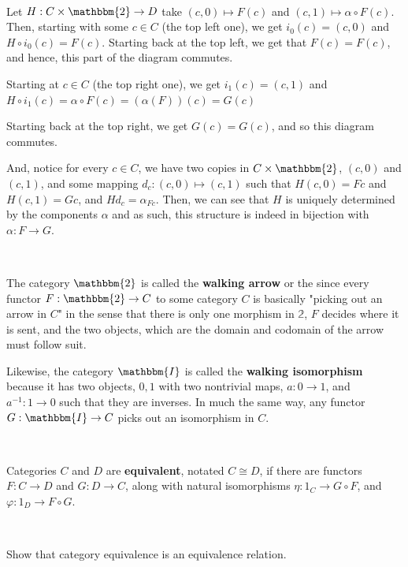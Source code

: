 \documentclass{article}
\begin{document}
\begin{customproof}
\

Let $H: C \times \mathbbm{2} \to D$ take $(c,0) \mapsto F(c)$ and $(c,1) \mapsto \alpha \circ F(c)$. Then, starting with some $c \in C$ (the top left one), we get $i_0(c) = (c,0)$ and $H \circ i_0(c) = F(c)$. Starting back at the top left, we get that $F(c) = F(c)$, and hence, this part of the diagram commutes. 

Starting at $c \in C$ (the top right one), we get $i_1(c) = (c,1)$ and $H \circ i_1(c) = \alpha \circ F(c) = (\alpha(F))(c) = G(c)$

Starting back at the top right, we get $G(c) = G(c)$, and so this diagram commutes. 

And, notice for every $c \in C$, we have two copies in $C \times \mathbbm{2}$, $(c,0)$ and $(c,1)$, and some mapping $d_c: (c,0) \mapsto (c, 1)$ such that $H(c,0) = Fc$ and $H(c,1) = Gc$, and $Hd_c = \alpha_{Fc}$. Then, we can see that $H$ is uniquely determined by the components $\alpha$ and as such, this structure is indeed in bijection with $\alpha: F \to G$.
\end{customproof}

\begin{definition}
\

The category $\mathbbm{2}$ is called the \textbf{walking arrow} or the since every functor $F: \mathbbm{2} \to C$ to some category $C$ is basically "picking out an arrow in $C$" in the sense that there is only one morphism in $\mathbb{2}$, $F$ decides where it is sent, and the two objects, which are the domain and codomain of the arrow must follow suit.

Likewise, the category $\mathbbm{I}$ is called the \textbf{walking isomorphism} because it has two objects, $0,1$ with two nontrivial maps, $a: 0 \to 1$, and $a ^{-1}: 1 \to 0$ such that they are inverses. In much the same way, any functor $G: \mathbbm{I} \to C$ picks out an isomorphism in $C$. 
\end{definition}

\begin{definition}
\

Categories $C$ and $D$ are \textbf{equivalent}, notated $C \cong D$, if there are functors $F: C \to D$ and $G: D \to C$, along with natural isomorphisms $\eta: 1_C \to G \circ F$, and $\varphi: 1_D \to F \circ G$.
\end{definition}

\begin{lemma}
\

Show that category equivalence is an equivalence relation.
\end{lemma}
\end{document}

